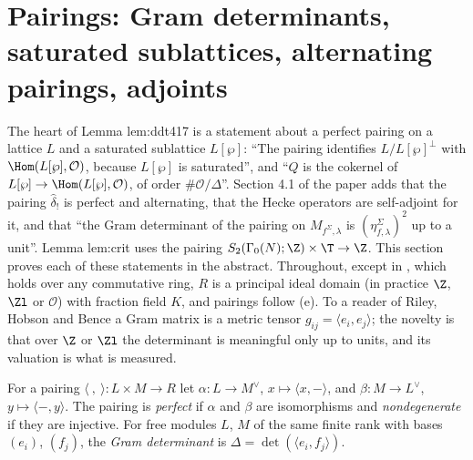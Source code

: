 \section[Pairings]{Pairings: Gram determinants, saturated sublattices, alternating pairings, adjoints}\label{sec:modules:pairings}

The heart of Lemma lem:ddt417 is a statement about a perfect pairing on a lattice $L$ and a saturated sublattice $L[\wp]$: ``The pairing
identifies $L/L[\wp]^\perp$ with $\Hom(L[\wp],\mathcal O)$, because $L[\wp]$ is saturated'', and ``$Q$ is the cokernel of $L[\wp]\to\Hom(L[\wp],\mathcal O)$, of
order $\#\mathcal O/\Delta$''. Section 4.1 of the paper adds that the pairing $\hat\delta_!$ is perfect and alternating, that the Hecke operators are
self-adjoint for it, and that ``the Gram determinant of the pairing on $M_{f^\Sigma,\lambda}$ is $(\eta^\Sigma_{f,\lambda})^2$ up to a unit''. Lemma lem:crit
uses the pairing $S_2(\Gamma_0(N);\Z)\times\T\to\Z$. This section proves each of these statements in the abstract. Throughout, except in , which holds over any commutative ring, $R$ is a principal
ideal domain (in practice $\Z$, $\Zl$ or $\mathcal O$) with fraction field $K$, and pairings follow (e). To a reader of Riley,
Hobson and Bence a Gram matrix is a metric tensor $g_{ij}=\langle e_i,e_j\rangle$; the novelty is that over $\Z$ or $\Zl$ the determinant is meaningful
only up to units, and its valuation is what is measured.

\begin{definition}\label{def:modules:pairing}
For a pairing $\langle\ ,\ \rangle\colon L\times M\to R$ let $\alpha\colon L\to M^\vee$, $x\mapsto\langle x,-\rangle$, and $\beta\colon M\to L^\vee$, $y\mapsto\langle-,y\rangle$. The pairing is
\emph{perfect} if $\alpha$ and $\beta$ are isomorphisms and \emph{nondegenerate} if they are injective. For free modules $L$, $M$ of the same finite rank
with bases $(e_i)$, $(f_j)$, the \emph{Gram determinant} is $\Delta=\det(\langle e_i,f_j\rangle)$.
\end{definition}

